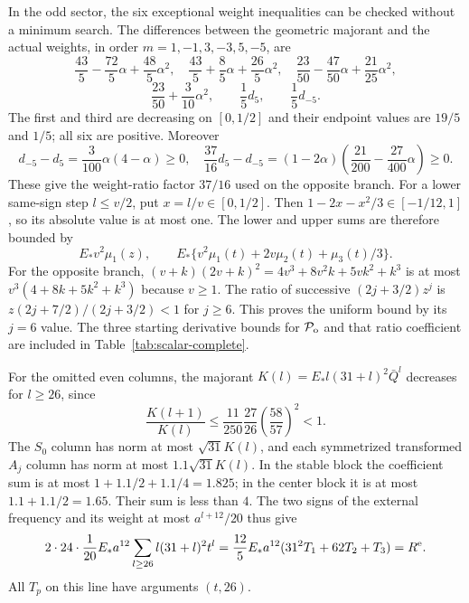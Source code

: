 In the odd sector, the six exceptional weight inequalities can be checked
without a minimum search. The differences between the geometric majorant and
the actual weights, in order $m=1,-1,3,-3,5,-5$, are
\[
 \frac{43}5-\frac{72}5\alpha+\frac{48}5\alpha^2,\quad
 \frac{43}5+\frac85\alpha+\frac{26}5\alpha^2,\quad
 \frac{23}{50}-\frac{47}{50}\alpha+\frac{21}{25}\alpha^2,
\]
\[
 \frac{23}{50}+\frac3{10}\alpha^2,\qquad
 \frac15d_5,\qquad \frac15d_{-5}.
\]
The first and third are decreasing on $[0,1/2]$ and their endpoint values
are $19/5$ and $1/5$; all six are positive. Moreover
\[
 d_{-5}-d_5=\frac3{100}\alpha(4-\alpha)\ge0,
 \quad \frac{37}{16}d_5-d_{-5}
 =(1-2\alpha)\left(\frac{21}{200}-\frac{27}{400}\alpha\right)\ge0.
\]
These give the weight-ratio factor $37/16$ used on the opposite branch.
For a lower same-sign step $l\le v/2$, put $x=l/v\in[0,1/2]$.
Then $1-2x-x^2/3\in[-1/12,1]$, so its absolute value is at most one.
The lower and upper sums are therefore bounded by
\[
 E_*v^2\mu_1(z),\qquad
 E_*\{v^2\mu_1(t)+2v\mu_2(t)+\mu_3(t)/3\}.
\]
For the opposite branch,
$(v+k)(2v+k)^2=4v^3+8v^2k+5vk^2+k^3$
is at most $v^3(4+8k+5k^2+k^3)$ because $v\ge1$.
The ratio of successive $(2j+3/2)z^j$ is
$z(2j+7/2)/(2j+3/2)<1$ for $j\ge6$.
This proves the uniform bound by its $j=6$ value. The three starting
derivative bounds for $\mathcal P_{\rm o}$ and that ratio coefficient
are included in Table~\ref{tab:scalar-complete}.

For the omitted even columns, the majorant
$K(l)=E_*l(31+l)^2\bar Q^l$ decreases for $l\ge26$, since
\[
 \frac{K(l+1)}{K(l)}
 \le\frac{11}{250}\frac{27}{26}\left(\frac{58}{57}\right)^2<1.
\]
The $S_0$ column has norm at most $\sqrt{31}K(l)$, and each
symmetrized transformed $A_j$ column has norm at most
$1.1\sqrt{31}K(l)$. In the stable block the coefficient sum is at most
$1+1.1/2+1.1/4=1.825$; in the center block it is at most
$1.1+1.1/2=1.65$. Their sum is less than $4$. The two signs of the external
frequency and its weight at most $a^{l+12}/20$ thus give
\[
 2\cdot24\cdot\frac1{20} E_*a^{12}
 \sum_{l\ge26}l(31+l)^2t^l
 =\frac{12}5E_*a^{12}(31^2T_1+62T_2+T_3)=R^{\rm e}.
\]
All $T_p$ on this line have arguments $(t,26)$.


